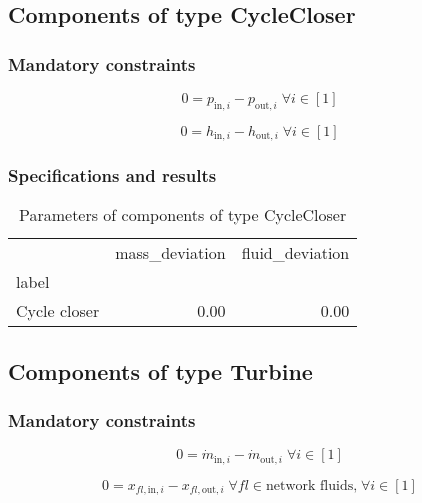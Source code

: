 \documentclass[]{article}
\begin{document}
\subsection{Components of type CycleCloser}

\subsubsection{Mandatory constraints}

\begin{equation}
\label{eq:CycleCloser_pressure_equality_constraints}
0=p_{\mathrm{in,}i}-p_{\mathrm{out,}i}\; \forall i \in [1]
\end{equation}

\begin{equation}
\label{eq:CycleCloser_enthalpy_equality_constraints}
0=h_{\mathrm{in,}i}-h_{\mathrm{out,}i}\; \forall i \in [1]
\end{equation}


\subsubsection{Specifications and results}

\begin{table}[H]
\centering
\caption{Parameters of components of type CycleCloser}
\begin{tabular}{lrr}
\toprule
{} & mass\_deviation & fluid\_deviation \\
label        &                 &                  \\
\midrule
Cycle closer &            0.00 &             0.00 \\
\bottomrule
\end{tabular}
\end{table}
\subsection{Components of type Turbine}

\subsubsection{Mandatory constraints}

\begin{equation}
\label{eq:Turbine_mass_flow_constraints}
0=\dot{m}_{\mathrm{in,}i}-\dot{m}_{\mathrm{out,}i}\; \forall i \in [1]
\end{equation}

\begin{equation}
\label{eq:Turbine_fluid_constraints}
0=x_{fl\mathrm{,in,}i}-x_{fl\mathrm{,out,}i}\;\forall fl \in\text{network fluids,}\; \forall i \in [1]
\end{equation}
\end{document}
